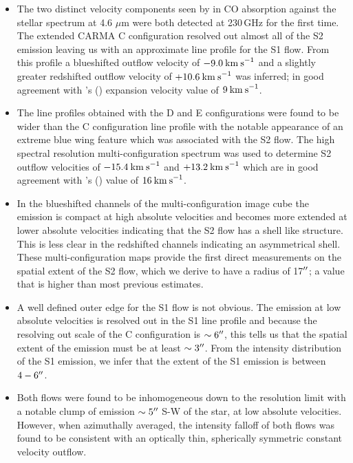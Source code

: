 \begin{itemize}

\item The two distinct velocity components seen by \cite{bernat_1979} in CO absorption against the stellar spectrum at 4.6 $\mu$m were both detected at 230\,GHz for the first time. The extended CARMA C configuration resolved out almost all of the S2 emission leaving us with an approximate line profile for the S1 flow. From this profile a blueshifted outflow velocity of $-9.0\>{\rm km\>s}^{-1}$ and a slightly greater redshifted outflow velocity of $+10.6\>{\rm km\>s}^{-1}$ was inferred; in good agreement with \citeauthor{bernat_1979}'s (\citeyear{bernat_1979}) expansion velocity value of $9\>{\rm km\>s}^{-1}$.  

\item The line profiles obtained with the D and E configurations were found to be wider than the C configuration line profile with the notable appearance of an extreme blue wing feature which was associated with the S2 flow. The high spectral resolution multi-configuration spectrum was used to determine S2 outflow velocities of $-15.4\>{\rm km\>s}^{-1}$ and $+13.2\>{\rm km\>s}^{-1}$ which are in good agreement with \citeauthor{bernat_1979}'s (\citeyear{bernat_1979})  value of $16\>{\rm km\>s}^{-1}$.  

\item In the blueshifted channels of the  multi-configuration image cube the emission is compact at high absolute velocities and becomes more extended at lower absolute velocities indicating that the S2 flow has a shell like structure. This is less clear in the redshifted channels indicating an asymmetrical shell. These multi-configuration maps provide the first direct measurements on the spatial extent of the S2 flow, which we derive to have a radius of 17$^{\prime\prime}$; a value that is higher than most previous estimates. 

\item A well defined outer edge for the S1 flow is not obvious. The emission at low absolute velocities is resolved out in the S1 line profile and because the resolving out scale of the C configuration is $\sim 6^{\prime\prime}$, this tells us that the spatial extent of the emission must be at least $\sim 3^{\prime\prime}$. From the intensity distribution of the S1 emission, we infer that the extent of the S1 emission is between $4-6^{\prime\prime}$.

\item Both flows were found to be inhomogeneous down to the resolution limit with a notable clump of emission $\sim 5^{\prime\prime}$ S-W of the star, at low absolute velocities. However, when azimuthally averaged, the intensity falloff of both flows was found to be consistent with an optically thin, spherically symmetric constant velocity outflow.


\end{itemize}
